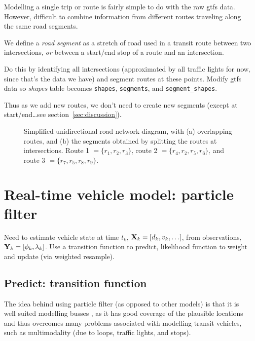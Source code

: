 \documentclass{IEEEtran}\usepackage[]{graphicx}\usepackage[]{color}
\newenvironment{knitrout}{}{} %
\begin{document}
Modelling a single trip or route is fairly simple to do with the raw \gls{gtfs} data.
However, difficult to combine information from different routes traveling along the same road segments.

We define a \emph{road segment} as a stretch of road used in a transit route between two intersections,
\emph{or} between a start/end stop of a route and an intersection.

Do this by identifying all intersections
(approximated by all traffic lights for now, since that's the data we have)
and segment routes at these points.
Modify \gls{gtfs} data so \emph{shapes} table becomes
\texttt{shapes}, \texttt{segments}, and \texttt{segment\_shapes}.

Thus as we add new routes, we don't need to create new segments
(except at start/end\ldots see section~\ref{sec:discussion}).


\begin{knitrout}
\color{fgcolor}\begin{figure}
\caption[Simplied diagram of overlapping routes]{Simplified unidirectional road network diagram, with (a) overlapping routes, and (b) the segments obtained by splitting the routes at intersections. Route 1 $ = \{r_1, r_2, r_3\}$, route 2 $=\{r_4,r_2,r_5,r_6\}$, and route 3 $=\{r_7,r_5,r_8,r_9\}$.}\label{fig:route_segmentation}
\end{figure}


\end{knitrout}



\section{Real-time vehicle model: particle filter}
\label{sec:pf}

Need to estimate vehicle state at time $t_k$, $\mathbf{X}_k = [d_k, v_k, \ldots]$, 
from observations, $\mathbf{Y}_k = [\phi_k, \lambda_k]$.
Use a transition function to predict,
likelihood function to weight and update (via weighted resample).


\subsection{Predict: transition function}
The idea behind using particle filter (as opposed to other models)
is that it is well suited modelling busses \cite{Hans2015},
as it has good coverage of the plausible locations and thus overcomes
many problems associated with modelling transit vehicles,
such as multimodality (due to loops, traffic lights, and stops).
\end{document}
